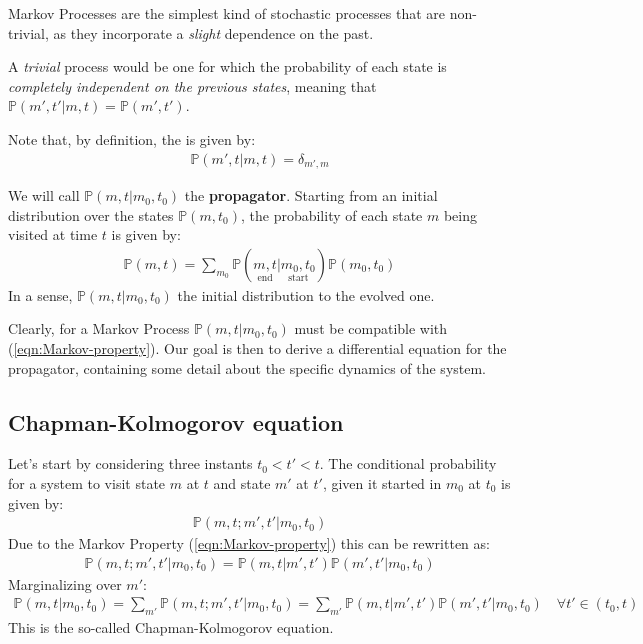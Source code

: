 \documentclass[../../main.tex]{subfiles}
\begin{document}
\medskip

Markov Processes are the simplest kind of stochastic processes that are non-trivial, as they incorporate a \textit{slight} dependence on the past. 

A \textit{trivial} process would be one for which the probability of each state is \textit{completely independent on the previous states}, meaning that $\mathbb{P}(m',t'|m,t) = \mathbb{P}(m',t')$. 

\medskip

Note that, by definition, the  is given by:
\begin{align*}
    \mathbb{P}(m',t|m,t) = \delta_{m',m}
\end{align*}

\medskip

We will call $\mathbb{P}(m, t| m_0, t_0)$ the \textbf{propagator}. Starting from an initial distribution over the states $\mathbb{P}(m, t_0)$, the probability of each state $m$ being visited at time $t$ is given by:
\begin{align}\label{eqn:propagator-evolution}
    \mathbb{P}(m,t) = \sum_{m_0} \mathbb{P}(\underset{\mathrm{end}}{m,t} |\underset{\mathrm{start}}{m_0,t_0} ) \mathbb{P}(m_0,t_0)
\end{align}
In a sense, $\mathbb{P}(m,t|m_0,t_0)$  the initial distribution to the evolved one.

\medskip

Clearly, for a Markov Process $\mathbb{P}(m,t|m_0,t_0)$ must be compatible with (\ref{eqn:Markov-property}). Our goal is then to derive a differential equation for the propagator, containing some detail about the specific dynamics of the system.

\subsection{Chapman-Kolmogorov equation}
Let's start by considering three instants $t_0 < t' < t$. The conditional probability for a system to visit state $m$ at $t$ and state $m'$ at $t'$, given it started in $m_0$ at $t_0$ is given by:
\begin{align*}
    \mathbb{P}(m,t;m',t'|m_0,t_0)
\end{align*}
Due to the Markov Property (\ref{eqn:Markov-property}) this can be rewritten as:
\begin{align*}
    \mathbb{P}(m,t;m',t'|m_0,t_0) = \mathbb{P}(m,t|m',t') \mathbb{P}(m',t'|m_0,t_0)
\end{align*}
Marginalizing over $m'$:
\begin{align}\label{eqn:chapman-kolmogorov}
    \mathbb{P}(m,t|m_0,t_0) = \sum_{m'} \mathbb{P}(m,t;m',t'|m_0,t_0) = \sum_{m'} \mathbb{P}(m,t|m',t') \mathbb{P}(m',t'|m_0,t_0) \quad \forall t' \in (t_0,t)
\end{align}
This is the so-called Chapman-Kolmogorov equation. 
\end{document}
